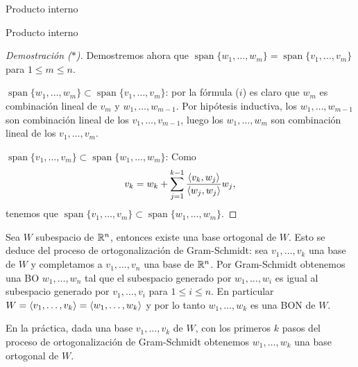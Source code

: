 \begin{chapter}{Producto interno}
\begin{section}{Producto interno}
\begin{proof}[Demostración ($*$)]
            Demostremos ahora que $\operatorname{span}\{w_1,\ldots, w_{m}\} = \operatorname{span}\{v_1,\ldots, v_{m}\}$ para $1 \le m \le n$. 
            
            $\operatorname{span}\{w_1,\ldots, w_{m}\} \subset \operatorname{span}\{v_1,\ldots, v_{m}\}$: por la fórmula ($i$) es claro que $w_m$  es combinación lineal de $v_m$ y $w_1,\ldots, w_{m-1}$. Por hipótesis inductiva, los $w_1,\ldots, w_{m-1}$ son combinación lineal de  los $v_1,\ldots, v_{m-1}$,  luego los $w_1,\ldots, w_{m}$ son combinación lineal de los  $v_1,\ldots, v_{m}$.
            
            $\operatorname{span}\{v_1,\ldots, v_{m}\} \subset \operatorname{span}\{w_1,\ldots, w_{m}\}$: Como
            $$
            v_k = w_k + \sum_{j = 1}^{k-1} \frac{\langle v_k,w_{j}\rangle}{\langle w_{j},w_{j}\rangle}w_{j},
            $$
            tenemos que 	$\operatorname{span}\{v_1,\ldots, v_{m}\} \subset \operatorname{span}\{w_1,\ldots, w_{m}\}$.
        \end{proof}
        
        

        
        \begin{obs*} Sea $W$ subespacio de $\mathbb R^n$, entonces existe una base ortogonal de $W$. Esto se deduce del proceso de ortogonalización de Gram-Schmidt: sea $v_1,\ldots,v_k$ una base de $W$ y completamos a $v_{1},\ldots,v_n$ una base de $\mathbb R^n$. Por Gram-Schmidt obtenemos una BO $w_{1},\ldots,w_n$ tal que el subespacio generado  por $w_{1},\ldots,w_i$ es igual al subespacio generado por $v_{1},\ldots,v_i$ para $1 \le i \le n$. En  particular $W = \langle v_{1},\ldots,v_k \rangle =  \langle w_{1},\ldots,w_k \rangle$ y por lo tanto  $w_{1},\ldots,w_k$ es una BON de $W$.
            
        En la práctica, dada una base $v_1,\ldots,v_k$ de $W$,  con los primeros $k$ pasos del proceso de ortogonalización de Gram-Schmidt obtenemos $ w_{1},\ldots,w_k $ una base ortogonal de $W$.
        \end{obs*}
        

\end{section}
\end{chapter}
